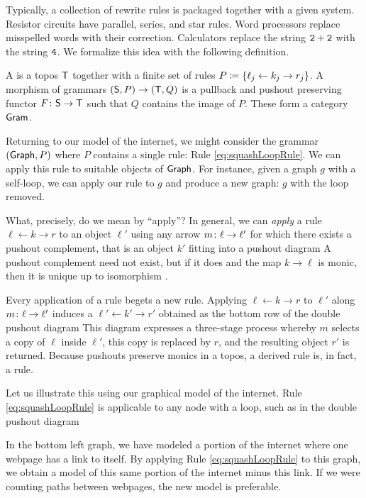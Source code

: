 \documentclass{amsart}
\begin{document}
Typically, a collection of rewrite rules is packaged
together with a given system. Resistor circuits have
parallel, series, and star rules. Word processors replace
misspelled words with their correction. Calculators replace
the string $\mathtt{2+2}$ with the string $ \mathtt{4} $. We
formalize this idea with the following definition.

\begin{definition}[Grammar] \label{def:grammar} A
   is a topos $ \mathsf{T} $ together with a
  finite set of rules
  $ P \coloneqq \{ \ell_j \leftarrow k_j \to r_j \} $. A
  morphism of grammars
  $ ( \mathsf{S} , P ) \to ( \mathsf{T} , Q ) $ is a pullback
  and pushout preserving functor
  $ F \colon \mathsf{S} \to \mathsf{T} $ such that $ Q $
  contains the image of $ P $. These form a
  category $ \mathsf{Gram} $.
\end{definition}

Returning to our model of the internet, we might consider the
grammar $ ( \mathsf{Graph}, P ) $ where $ P $ contains a single
rule: Rule \eqref{eq:squashLoopRule}. We can apply this rule
to suitable objects of $ \mathsf{Graph} $.  For instance, given a
graph $g$ with a self-loop, we can apply our rule to $ g $
and produce a new graph: $ g $ with the loop removed.

What, precisely, do we mean by ``apply''?
In general, we can \emph{apply} a rule
$ \ell \gets k \to r $ to an object $ \ell' $
using any arrow $ m \colon \ell \to \ell' $ for
which there exists a pushout complement, that is
an object $ k' $ fitting into a pushout diagram
 A pushout
complement need not exist, but if it does and the
map $ k \to \ell $ is monic, then it is unique up to isomorphism
\cite[Lem.~15]{LackSobo_Adhesive}.

Every application of a rule begets a new rule. Applying
$ \ell \gets k \to r $ to $\ell'$ along
$ m \colon \ell \to \ell' $ induces a 
$ \ell' \gets k' \to r' $ obtained as the bottom row of the
double pushout diagram  This diagram expresses a three-stage process whereby
$ m $ selects a copy of $ \ell $ inside $ \ell' $, this copy
is replaced by $ r $, and the resulting object $ r' $ is
returned.  Because pushouts preserve monics in a topos, a
derived rule is, in fact, a rule.

Let us illustrate this using our graphical model
of the internet.  Rule \eqref{eq:squashLoopRule}
is applicable to any node with a loop, such as in
the double pushout diagram

In the bottom left graph, we have modeled a
portion of the internet where one webpage has a
link to itself.  By applying Rule
\eqref{eq:squashLoopRule} to this graph, we obtain
a model of this same portion of the internet minus
this link. If we were counting paths between
webpages, the new model is preferable.  
\end{document}
